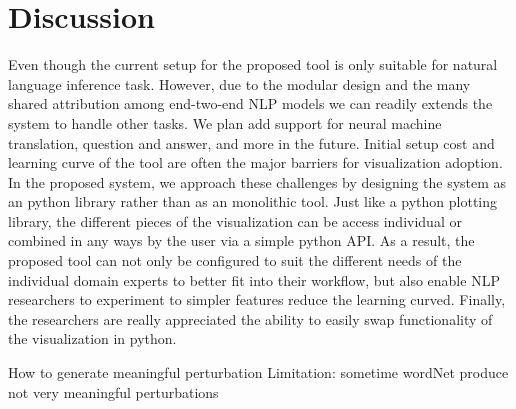 \section{Discussion}

Even though the current setup for the proposed tool is only suitable for natural language inference task. However, due to the modular design and the many shared attribution among end-two-end NLP models we can readily extends the system to handle other tasks. We plan add support for neural machine translation, question and answer, and more in the future.
%
Initial setup cost and learning curve of the tool are often the major barriers for visualization adoption.
In the proposed system, we approach these challenges by designing the system as an python library rather than as an monolithic tool. 
Just like a python plotting library, the different pieces of the visualization can be access individual or combined in any ways by the user via a simple python API.
As a result, the proposed tool can not only be configured to suit the different needs of the individual domain experts to better fit into their workflow, but also enable NLP researchers to experiment to simpler features reduce the learning curved. 
Finally, the researchers are really appreciated the ability to easily swap functionality of the visualization in python.

How to generate meaningful perturbation
Limitation: sometime wordNet produce not very meaningful  perturbations

